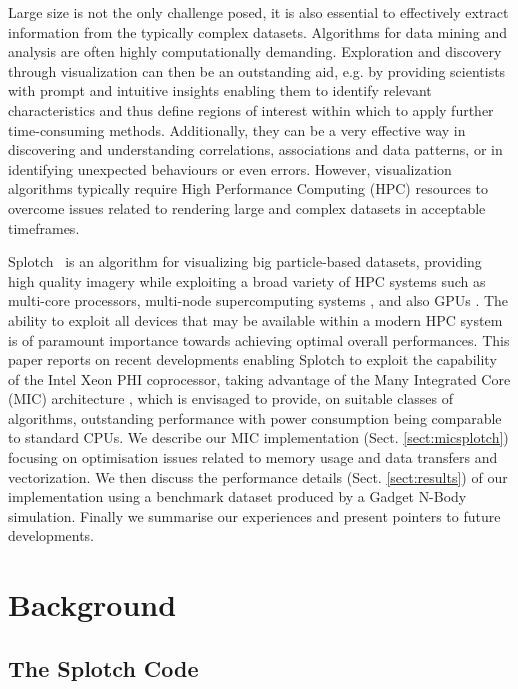 \documentclass[runningheads,a4paper]{llncs}
\begin{document}
Large size is not the only challenge posed, it is also essential to effectively extract information from the typically complex datasets. 
Algorithms for data mining and analysis are often highly computationally demanding.
Exploration and discovery through visualization can then be an outstanding aid,
e.g. by providing scientists with prompt and intuitive insights enabling them to identify relevant characteristics and thus
define regions of interest within which to apply further time-consuming methods. Additionally, they can be a very effective
way in discovering and understanding correlations, associations and data patterns, or in identifying unexpected behaviours or
even errors. However, visualization algorithms typically require High Performance Computing (HPC) resources to overcome issues
related to rendering large and complex datasets in acceptable timeframes.

Splotch~\cite{splotch} is an algorithm for visualizing big particle-based datasets, providing high quality imagery while exploiting
a broad variety of HPC systems such as multi-core processors, multi-node supercomputing systems \cite{splotchmulti}, and
also GPUs \cite{splotchgpu}. The ability to exploit all devices that may be available within a modern HPC system is of paramount
importance towards achieving optimal overall performances. This paper reports on recent developments enabling Splotch to
exploit the capability of the Intel Xeon PHI \cite{xeonphi} coprocessor, taking advantage of the Many Integrated Core (MIC)
architecture \cite{mic}, which is envisaged to provide, on suitable classes of algorithms, outstanding performance with power
consumption being comparable to standard CPUs. 
We describe our MIC implementation (Sect. \ref{sect:micsplotch}) focusing on optimisation issues related to memory usage and data 
transfers and vectorization. We then discuss the performance details (Sect. \ref{sect:results}) of our implementation using a 
benchmark dataset produced by a Gadget \cite{gadget} N-Body simulation. 
Finally we summarise our experiences and present pointers to future developments.

\section{Background}
\label{sect:background}

\subsection{The Splotch Code}
\label{sect:splotchcode}
\end{document}
